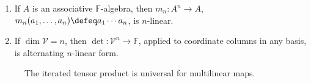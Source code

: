 \begin{example} \label{ex:basic-multilinear-maps} 
\begin{enumerate}[label=(\roman*)]
\setlength{\itemsep}{0pt}
\item If $A$ is an associative $\mathbb{F}$-algebra, then $m_n:A^n\to A$, $m_n(a_1,\ldots,a_n)\defeq a_1\cdots a_n$, is $n$-linear.
\item If $\dim\mathcal{V}=n$, then $\det:\mathcal{V}^n\to\mathbb{F}$, applied to coordinate columns in any basis, is alternating $n$-linear form.
\end{enumerate}
\end{example}

\begin{figure}[H]
  \centering
  
  \caption{The iterated tensor product is universal for multilinear maps.}
  \label{fig:multilinear-tensor-universal-property}
\end{figure}

